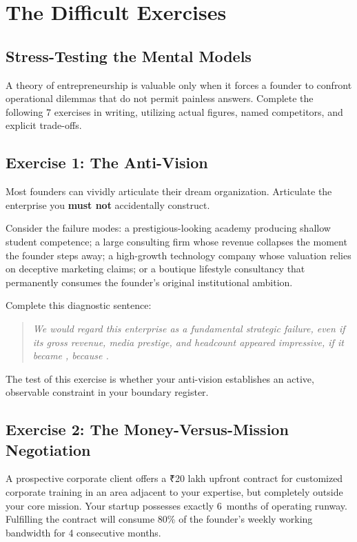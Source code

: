 \section{The Difficult Exercises}

\subsection{Stress-Testing the Mental Models}

A theory of entrepreneurship is valuable only when it forces a founder to confront operational dilemmas that do not permit painless answers. Complete the following 7 exercises in writing, utilizing actual figures, named competitors, and explicit trade-offs.

\subsection{Exercise 1: The Anti-Vision}

Most founders can vividly articulate their dream organization. Articulate the enterprise you \textbf{must not} accidentally construct.

Consider the failure modes: a prestigious-looking academy producing shallow student competence; a large consulting firm whose revenue collapses the moment the founder steps away; a high-growth technology company whose valuation relies on deceptive marketing claims; or a boutique lifestyle consultancy that permanently consumes the founder's original institutional ambition.

Complete this diagnostic sentence:
\begin{quote}
\itshape
We would regard this enterprise as a fundamental strategic failure, even if its gross revenue, media prestige, and headcount appeared impressive, if it became \underline{\hspace{3cm}}, because \underline{\hspace{4.5cm}}.
\end{quote}

The test of this exercise is whether your anti-vision establishes an active, observable constraint in your boundary register.

\subsection{Exercise 2: The Money-Versus-Mission Negotiation}

A prospective corporate client offers a ₹20 lakh upfront contract for customized corporate training in an area adjacent to your expertise, but completely outside your core mission. Your startup possesses exactly 6~months of operating runway. Fulfilling the contract will consume 80\% of the founder's weekly working bandwidth for 4 consecutive months.

